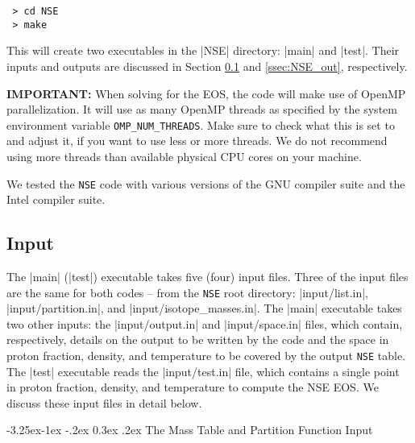 \documentclass[letterpaper,11pt]{refart}
\makeatletter
\renewcommand\subsubsection{\@startsection{subsubsection}{3}{\z@}%
                           {-3.25ex\@plus -1ex \@minus -.2ex}%
                           {0.3ex \@plus .2ex}%
                           {\normalfont\normalsize\bf\fontsize{11}{13}\selectfont}}
\makeatother
\begin{document}
\begin{verbatim}
 > cd NSE
 > make
\end{verbatim}


This will create two executables in the
\verbfile|NSE| directory: \verbexec|main| and \verbexec|test|.  
Their inputs and outputs are discussed in Section \ref{ssec:NSE_in}
and \ref{ssec:NSE_out}, respectively.

\textbf{IMPORTANT:} When solving for the EOS, the code will make use
of OpenMP parallelization. It will use as many OpenMP threads as
specified by the system environment variable
\texttt{OMP\_NUM\_THREADS}. Make sure to check what this is set to and
adjust it, if you want to use less or more threads. We do not
recommend using more threads than available physical CPU cores on your
machine.

We tested the \texttt{NSE} code with various versions of the GNU
compiler suite and the Intel compiler suite.





\subsection{Input}\label{ssec:NSE_in}


The \verbexec|main| (\verbexec|test|) executable takes five (four)
input files.  Three of the input files are the same for both codes --
from the \texttt{\color{red}NSE} root directory:
\verbfile|input/list.in|, \verbfile|input/partition.in|, and
\verbfile|input/isotope_masses.in|.  The \verbexec|main| executable 
takes two other inputs: the \verbfile|input/output.in|
and \verbfile|input/space.in| files, which contain,
respectively, details on the output to be written by the code and the
space in proton fraction, density, and temperature to be covered by
the output \texttt{NSE} table.  The \verbexec|test| executable reads
the \verbfile|input/test.in| file, which contains a single point in
proton fraction, density, and temperature to compute the NSE EOS.  We
discuss these input files in detail below.




\subsubsection{The Mass Table and Partition Function Input}
\label{sssec:mass_table.in}
\end{document}
